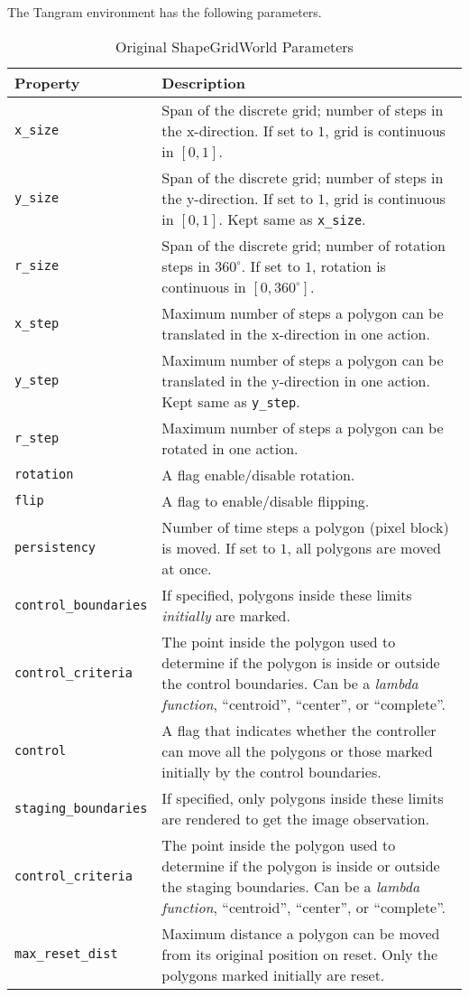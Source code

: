 The Tangram environment has the following parameters.
\begin{table}[H]
    \centering
    \begin{tabularx}{\textwidth}{C{4.2cm} L}
        \hline
        Property & Description\\
        \hline
        \texttt{x\_size} & Span of the discrete grid; number of steps in the x-direction. If set to \(1\), grid is continuous in \([0, 1]\).\\
        \texttt{y\_size} & Span of the discrete grid; number of steps in the y-direction. If set to \(1\), grid is continuous in \([0, 1]\). Kept same as \texttt{x\_size}.\\
        \texttt{r\_size} & Span of the discrete grid; number of rotation steps in \(360^\circ\). If set to \(1\), rotation is continuous in \([0, 360^\circ]\).\\
        \texttt{x\_step} & Maximum number of steps a polygon can be translated in the x-direction in one action.\\
        \texttt{y\_step} & Maximum number of steps a polygon can be translated in the y-direction in one action. Kept same as \texttt{y\_step}.\\
        \texttt{r\_step} & Maximum number of steps a polygon can be rotated in one action.\\
        \texttt{rotation} & A flag enable/disable rotation.\\
        \texttt{flip} & A flag to enable/disable flipping.\\
        \texttt{persistency} & Number of time steps a polygon (pixel block) is moved. If set to \(1\), all polygons are moved at once.\\
        \texttt{control\_boundaries} & If specified, polygons inside these limits \emph{initially} are marked.\\
        \texttt{control\_criteria} & The point inside the polygon used to determine if the polygon is inside or outside the control boundaries. Can be a \emph{lambda function}, ``centroid'', ``center'', or ``complete''.\\
        \texttt{control} & A flag that indicates whether the controller can move all the polygons or those marked initially by the control boundaries.\\
        \texttt{staging\_boundaries} & If specified, only polygons inside these limits are rendered to get the image observation.\\
        \texttt{control\_criteria} & The point inside the polygon used to determine if the polygon is inside or outside the staging boundaries. Can be a \emph{lambda function}, ``centroid'', ``center'', or ``complete''.\\
        \texttt{max\_reset\_dist} & Maximum distance a polygon can be moved from its original position on reset. Only the polygons marked initially are reset.\\
        \hline
    \end{tabularx}
    \caption{Original ShapeGridWorld Parameters}
    \label{tab:tangram-params}
\end{table}
